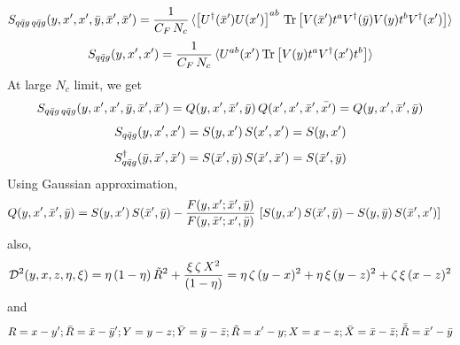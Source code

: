 \documentclass[9pt]{article}
\numberwithin{equation}{section}
\begin{document}
\begin{itemize}
$$S_{q\Bar{q}g\,q\Bar{q}g}(y,x',x',\Bar{y},\Bar{x}',\Bar{x}') = \frac{1}{C_{F}\,N_{c}}\, \langle \left[U^{\dagger}(\Bar{x}')U(x')\right]^{ab}\, \text{Tr}\left[V(\Bar{x}')t^{a}V^{\dagger}(\Bar{y})V(y)t^{b}V^{\dagger}(x')\right] \rangle$$
$$S_{q\Bar{q}g}(y,x',x') =  \frac{1}{C_{F}\,N_{c}}\, \langle U^{ab}(x')\,\text{Tr}\left[V(y)t^{a}V^{\dagger}(x')t^{b}\right]\rangle$$
At large $N_{c}$ limit, we get
$$S_{q\Bar{q}g\,q\Bar{q}g}(y,x',x',\Bar{y},\Bar{x}',\Bar{x}') = Q(y,x',\Bar{x}',\Bar{y})\, Q(x',x',\Bar{x}',\Bar{x'}) = Q(y,x',\Bar{x}',\Bar{y}) $$
$$S_{q\Bar{q}g}(y,x',x') = S(y,x')\, S(x',x') = S(y,x')$$
$$S^{\dagger}_{q\Bar{q}g}(\Bar{y},\Bar{x}',\Bar{x}') = S(\Bar{x}',\Bar{y})\, S(\Bar{x}',\Bar{x}') = S(\Bar{x}',\Bar{y})$$
Using Gaussian approximation,
\begin{align}
    Q(y,x',\Bar{x}',\Bar{y}) & = S(y,x')\,S(\Bar{x}',\Bar{y}) - \frac{F(y,x';\Bar{x}',\Bar{y})}{F(y,\Bar{x}';x',\Bar{y})}\, \left[S(y,x')\,S(\Bar{x}',\Bar{y})-S(y,\Bar{y})\, S(\Bar{x}',x')\right]
\end{align}
also,  $$\mathcal{D}^{2}(y,x,z,\eta,\xi) = \eta\,(1-\eta)\,\Tilde{R}^{2} + \frac{\xi\,\zeta\,X^{2}}{(1-\eta)} = \eta\,\zeta\,(y-x)^{2} + \eta\,\xi\,(y-z)^{2} + \zeta\,\xi\,(x-z)^{2}$$
and
$$R = x-y'; \Bar{R} = \Bar{x}-\Bar{y}'; Y = y-z; \Bar{Y} = \Bar{y}-\Bar{z}; \Tilde{R} = x'-y; X = x-z; \Bar{X} = \Bar{x}-\Bar{z}; \Bar{\Tilde{R}} = \Bar{x}'-\Bar{y}$$
\end{itemize}
\end{document}
